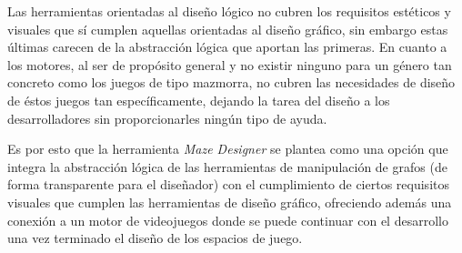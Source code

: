 Las herramientas orientadas al diseño lógico no cubren los requisitos estéticos y visuales que sí cumplen aquellas orientadas al diseño gráfico, sin embargo estas últimas carecen de la abstracción lógica que aportan las primeras.
En cuanto a los motores, al ser de propósito general y no existir ninguno para un género tan concreto como los juegos de tipo mazmorra, no cubren las necesidades de diseño de éstos juegos tan específicamente, dejando la tarea del diseño a los desarrolladores sin proporcionarles ningún tipo de ayuda.

Es por esto que la herramienta \textit{Maze Designer} se plantea como una opción que integra la abstracción lógica de las herramientas de manipulación de grafos (de forma transparente para el diseñador) con el cumplimiento de ciertos requisitos visuales que cumplen las herramientas de diseño gráfico, ofreciendo además una conexión a un motor de videojuegos donde se puede continuar con el desarrollo una vez terminado el diseño de los espacios de juego.